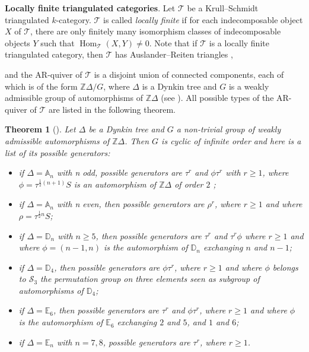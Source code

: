 \documentclass[12pt]{article}
\theoremstyle{plain}
\newtheorem{Theo}[Def]{Theorem}
\theoremstyle{definition}
\DeclareMathOperator{\Hom}{Hom}
\newcommand{\T}{\mathcal{T}}
\renewcommand{\geq}{\geqslant}
\begin{document}
\medskip 
{\bf Locally finite triangulated categories}. Let $\T$ be a Krull--Schmidt  triangulated $k$-category. $\T$ is called {\em locally finite} if for each indecomposable object $X$ of $\T$, there are only finitely many isomorphism classes of indecomposable objects $Y$ such that $\Hom_{\T}(X, Y) \neq 0$. Note that if $\T$ is a locally finite triangulated category, then $\T$ has Auslander--Reiten triangles \cite{Xiao2002},

and the AR-quiver of $\T$ is a disjoint union of connected components, each of which is of the form $\mathbb{Z}\Delta/G$, where $\Delta$ is a Dynkin tree and $G$ is a weakly admissible group of automorphisms of $\mathbb{Z}\Delta$ (see \cite{Xiao2005,Amiot2007}). All possible types of the AR-quiver of $\T$ are listed in the following theorem. 
\begin{Theo}[{\cite[Theorem 2.1]{Amiot2007}}]
\label{thm-locally-finite-classification}
Let $\Delta$ be a Dynkin tree and $G$ a non-trivial group of weakly admissible  automorphisms of $\mathbb{Z}\Delta$. Then $G$ is cyclic of infinite order and here is a list of its possible generators:
\begin{itemize}
    \item if $\Delta=\mathbb{A}_n$ with n odd, possible generators are $\tau^{r}$ and $\phi \tau^{r}$ with $r\geq 1$, where $\phi=\tau^{\frac{1}{2}(n+1)}S$ is an automorphism of $\mathbb{Z}\Delta$ of order $2$ ;
    \item if $\Delta=\mathbb{A}_n$ with n even, then possible generators are $\rho^r$, where $r\geq 1$ and where $\rho=\tau^{\frac{1}{2}n}S$;
    \item if $\Delta=\mathbb{D}_n$ with $n\geq 5$, then possible generators are $\tau^{r}$ and $ \tau^{r}\phi$ where $r\geq 1$ and where $\phi=(n-1,n)$ is the automorphism of $\mathbb{D}_n$ exchanging $n$ and $n-1$;
    \item if \(\Delta = \mathbb{D}_4\), then possible generators are \(\phi \tau^r\), where \(r \geq 1\) and where \(\phi\) belongs to \(\mathcal{S}_3\) the permutation group on three elements seen as subgroup of automorphisms of \(\mathbb{D}_4\);
\item if \(\Delta = \mathbb{E}_6\), then possible generators are \(\tau^r\) and \(\phi \tau^r\), where \(r \geq 1\) and where \(\phi\) is the automorphism of \(\mathbb{E}_6\) exchanging $2$ and $5$, and $1$ and $6$;
\item if \(\Delta = \mathbb{E}_n\) with \(n = 7, 8\), possible generators are \(\tau^r\), where \(r \geq 1\).
\end{itemize}
\end{Theo}
\end{document}
